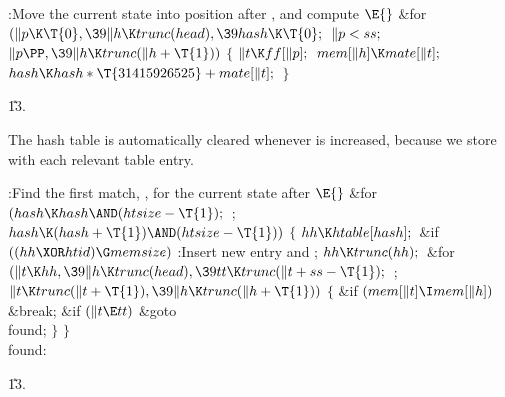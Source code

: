 \B{}:Move the current state into position after , and
compute \X${}\E{}$\6
\&{for} ${}(\|p\K\T{0},\39\|h\K\\{trunc}(\\{head}),\39\\{hash}\K\T{0};{}$ ${}%
\|p<\\{ss};{}$ ${}\|p\PP,\39\|h\K\\{trunc}(\|h+\T{1})){}$\5
${}\{{}$\1\6
${}\|t\K\\{ff}[\|p];{}$\6
${}\\{mem}[\|h]\K\\{mate}[\|t];{}$\6
${}\\{hash}\K\\{hash}*\T{31415926525}+\\{mate}[\|t];{}$\6
\4${}\}{}$\2\par
\U13.\fi

The hash table is automatically cleared whenever  is
increased,
because we store  with each relevant table entry.

\Y\B\4:Find the first match, , for the current state after \X${}\E{}$\6
\&{for} ${}(\\{hash}\K\\{hash}\AND(\\{htsize}-\T{1});{}$  ; ${}\\{hash}\K(%
\\{hash}+\T{1})\AND(\\{htsize}-\T{1})){}$\5
${}\{{}$\1\6
${}\\{hh}\K\\{htable}[\\{hash}];{}$\6
\&{if} ${}((\\{hh}\XOR\\{htid})\G\\{memsize}){}$\1\5
:Insert new entry and \X;\2\6
${}\\{hh}\K\\{trunc}(\\{hh});{}$\6
\&{for} ${}(\|t\K\\{hh},\39\|h\K\\{trunc}(\\{head}),\39\\{tt}\K\\{trunc}(\|t+%
\\{ss}-\T{1});{}$  ; ${}\|t\K\\{trunc}(\|t+\T{1}),\39\|h\K\\{trunc}(\|h+%
\T{1})){}$\5
${}\{{}$\1\6
\&{if} ${}(\\{mem}[\|t]\I\\{mem}[\|h]){}$\1\5
\&{break};\2\6
\&{if} ${}(\|t\E\\{tt}){}$\1\5
\&{goto} \\{found};\2\6
\4${}\}{}$\2\6
\4${}\}{}$\2\6
\\{found}:\par
\U13.\fi

